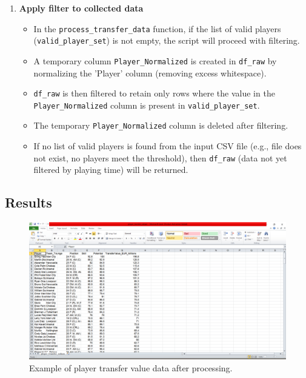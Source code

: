 \documentclass[12pt, a4paper]{report}
\begin{document}
\begin{enumerate}[label=\textbf{Step \arabic*:}, leftmargin=* , itemsep=1ex]
    \item \textbf{Apply filter to collected data}
    \begin{itemize}
        \item In the \texttt{process\_transfer\_data} function, if the list of valid players \newline 
        (\texttt{valid\_player\_set}) is not empty, the script will proceed with filtering.
        \item A temporary column \texttt{Player\_Normalized} is created in \texttt{df\_raw} by normalizing the 'Player' column (removing excess whitespace).
        \item \texttt{df\_raw} is then filtered to retain only rows where the value in the \newline \texttt{Player\_Normalized} column is present in \texttt{valid\_player\_set}.
        \item The temporary \texttt{Player\_Normalized} column is deleted after filtering.
        \item If no list of valid players is found from the input CSV file (e.g., file does not exist, no players meet the threshold), then \texttt{df\_raw} (data not yet filtered by playing time) will be returned.
    \end{itemize}
\end{enumerate}

\subsection{Results}

\begin{figure}[H]
    \centering
    \includegraphics[width=\textwidth]{player_values.png}
    \caption{Example of player transfer value data after processing.}
    \label{fig:player_transfer_values}
\end{figure}
\end{document}
